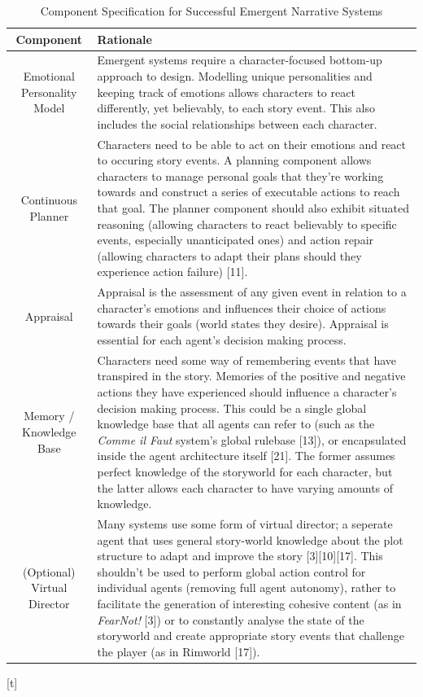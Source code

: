 \documentclass{sig-alternate-05-2015}
\begin{document}
\begin{table}[t]
\centering
\caption{Component Specification for Successful Emergent Narrative Systems}
    \begin{tabular}{| c | p{13cm} |}
    \hline
    \textbf{Component} & \textbf{Rationale} \\ \hline
    Emotional Personality Model & Emergent systems require a character-focused bottom-up approach to design. Modelling unique personalities and keeping track of emotions allows characters to react differently, yet believably, to each story event. This also includes the social relationships between each character. \\ \hline
    Continuous Planner & Characters need to be able to act on their emotions and react to occuring story events. A planning component allows characters to manage personal goals that they're working towards and construct a series of executable actions to reach that goal. The planner component should also exhibit situated reasoning (allowing characters to react believably to specific events, especially unanticipated ones) and action repair (allowing characters to adapt their plans should they experience action failure) [11]. \\ \hline
    Appraisal & Appraisal is the assessment of any given event in relation to a character's emotions and influences their choice of actions towards their goals (world states they desire). Appraisal is essential for each agent's decision making process. \\ \hline
    Memory / Knowledge Base & Characters need some way of remembering events that have transpired in the story. Memories of the positive and negative actions they have experienced should influence a character's decision making process. This could be a single global knowledge base that all agents can refer to (such as the \textit{Comme il Faut} system's global rulebase [13]), or encapsulated inside the agent architecture itself [21]. The former assumes perfect knowledge of the storyworld for each character, but the latter allows each character to have varying amounts of knowledge. \\ \hline
    (Optional) Virtual Director & Many systems use some form of virtual director; a seperate agent that uses general story-world knowledge about the plot structure to adapt and improve the story [3][10][17]. This shouldn't be used to perform global action control for individual agents (removing full agent autonomy), rather to facilitate the generation of interesting cohesive content (as in \textit{FearNot!} [3]) or to constantly analyse the state of the storyworld and create appropriate story events that challenge the player (as in Rimworld [17]). \\ \hline
    \end{tabular}
\end{table}[t]
\end{document}
